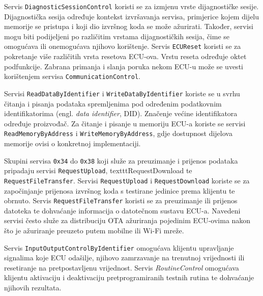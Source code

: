 \documentclass[times, utf8, diplomski, numeric]{fer}
\begin{document}
Servis \texttt{DiagnosticSessionControl} koristi se za izmjenu vrste dijagnostičke sesije. Dijagnostička sesija određuje kontekst izvršavanja servisa, primjerice kojem dijelu memorije se pristupa i koji dio izvršnog koda se može ažurirati. Također, servisi mogu biti podijeljeni po različitim vrstama dijagnostičkih sesija, čime se omogućava ili onemogućava njihovo korištenje. Servis \texttt{ECUReset} koristi se za pokretanje više različitih vrsta resetova ECU-ova. Vrstu reseta određuje oktet podfunkcije. Zabrana primanja i slanja poruka nekom ECU-u može se uvesti korištenjem servisa \texttt{CommunicationControl}.

Servisi \texttt{ReadDataByIdentifier} i \texttt{WriteDataByIdentifier} koriste se u svrhu čitanja i pisanja podataka spremljenima pod određenim podatkovnim identifikatorima (engl. \textit{data identifier}, DID). Značenje većine identifikatora određuje proizvođač. Za čitanje i pisanje u memoriju ECU-a koriste se servisi \texttt{ReadMemoryByAddress} i \texttt{WriteMemoryByAddress}, gdje dostupnost dijelova memorije ovisi o konkretnoj implementaciji\cite{falch2022uds, dissecto2023uds}.

Skupini servisa \texttt{0x34} do \texttt{0x38} koji služe za preuzimanje i prijenos podataka pripadaju servisi \texttt{RequestUpload}, texttt{RequestDownload} te \texttt{RequestFileTransfer}. Servisi \texttt{RequestUpload} i \texttt{RequestDownload} koriste se za započinjanje prijenosa izvršnog koda s testirane jedinice prema klijentu te obrnuto. Servis \texttt{RequestFileTransfer} koristi se za preuzimanje ili prijenos datoteka te dohvaćanje informacija o datotečnom sustavu ECU-a. Navedeni servisi često služe za distribuciju OTA ažuriranja pojedinim ECU-ovima nakon što je ažuriranje preuzeto putem mobilne ili Wi-Fi mreže.

Servis \texttt{InputOutputControlByIdentifier} omogućava klijentu upravljanje signalima koje ECU odašilje, njihovo zamrzavanje na trenutnoj vrijednosti ili resetiranje na pretpostavljenu vrijednost. Servis \textit{RoutineControl} omogućava klijentu aktivaciju i deaktivaciju pretprogramiranih testnih rutina te dohvaćanje njihovih rezultata.
\end{document}
